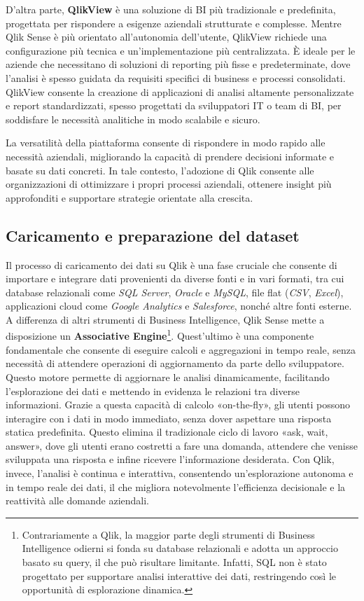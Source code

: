 D'altra parte, \textbf{QlikView} è una soluzione di BI più tradizionale e predefinita, progettata per rispondere a esigenze aziendali strutturate e complesse. Mentre Qlik Sense è più orientato all’autonomia dell'utente, QlikView richiede una configurazione più tecnica e un'implementazione più centralizzata. È ideale per le aziende che necessitano di soluzioni di reporting più fisse e predeterminate, dove l'analisi è spesso guidata da requisiti specifici di business e processi consolidati. QlikView consente la creazione di applicazioni di analisi altamente personalizzate e report standardizzati, spesso progettati da sviluppatori IT o team di BI, per soddisfare le necessità analitiche in modo scalabile e sicuro.

La versatilità della piattaforma consente di rispondere in modo rapido alle necessità aziendali, migliorando la capacità di prendere decisioni informate e basate su dati concreti. In tale contesto, l'adozione di Qlik consente alle organizzazioni di ottimizzare i propri processi aziendali, ottenere insight più approfonditi e supportare strategie orientate alla crescita.


\subsection{Caricamento e preparazione del dataset}
Il processo di caricamento dei dati su Qlik è una fase cruciale che consente di importare e integrare dati provenienti da diverse fonti e in vari formati, tra cui database relazionali come \textit{SQL Server}, \textit{Oracle} e \textit{MySQL}, file flat (\textit{CSV}, \textit{Excel}), applicazioni cloud come \textit{Google Analytics} e \textit{Salesforce}, nonché altre fonti esterne.
A differenza di altri strumenti di Business Intelligence, Qlik Sense mette a disposizione un \textbf{Associative Engine}\footnote{Contrariamente a Qlik, la maggior parte degli strumenti di Business Intelligence odierni si fonda su database relazionali e adotta un approccio basato su query, il che può risultare limitante. Infatti, SQL non è stato progettato per supportare analisi interattive dei dati, restringendo così le opportunità di esplorazione dinamica.}. Quest'ultimo è una componente fondamentale che consente di eseguire calcoli e aggregazioni in tempo reale, senza necessità di attendere operazioni di aggiornamento da parte dello sviluppatore. Questo motore permette di aggiornare le analisi dinamicamente, facilitando l'esplorazione dei dati e mettendo in evidenza le relazioni tra diverse informazioni. Grazie a questa capacità di calcolo «on-the-fly», gli utenti possono interagire con i dati in modo immediato, senza dover aspettare una risposta statica predefinita. Questo elimina il tradizionale ciclo di lavoro «ask, wait, answer», dove gli utenti erano costretti a fare una domanda, attendere che venisse sviluppata una risposta e infine ricevere l'informazione desiderata. Con Qlik, invece, l'analisi è continua e interattiva, consentendo un'esplorazione autonoma e in tempo reale dei dati, il che migliora notevolmente l'efficienza decisionale e la reattività alle domande aziendali.

